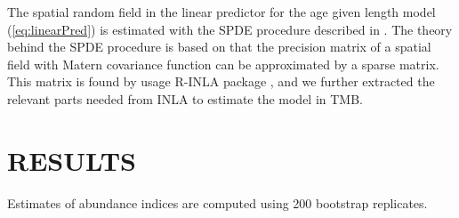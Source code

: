 \documentclass[a4paper 12pt]{article}
\numberwithin{equation}{section}
\begin{document}
The spatial random field in the linear predictor for the age given length model (\ref{eq:linearPred}) is estimated with the SPDE procedure described in \citep{lindgren2011explicit}. The theory behind the SPDE procedure is based on that the precision matrix of a spatial field with Matern covariance function can be approximated by a sparse matrix. This matrix is found by usage R-INLA package \citep{rue2009approximate}, and we further extracted the relevant parts needed from INLA to estimate the model in TMB.







\clearpage
\section{RESULTS}
\label{sec:results}
Estimates of abundance indices are computed using 200 bootstrap replicates.

\end{document}
